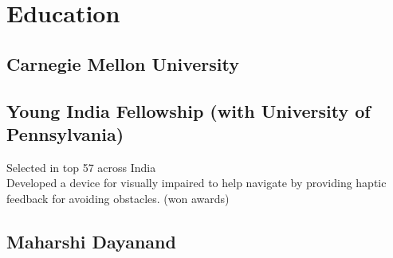 \documentclass[]{resume-openfont}
\begin{document}
 

%
%

%
%



%
%

\begin{minipage}[t]{0.36\textwidth} 


\section{Education} 

\subsection{Carnegie Mellon University}
\sectionsep

\subsection{Young India Fellowship (with University of Pennsylvania)}
Selected in top 57 across India \\
Developed a \href{https://www.youtube.com/watch?v=F2xGf-Cr6nI}{} device for visually impaired to help navigate by providing haptic feedback for avoiding obstacles. (won awards)
\sectionsep

\subsection{Maharshi Dayanand} 

\end{minipage}
\end{document}

